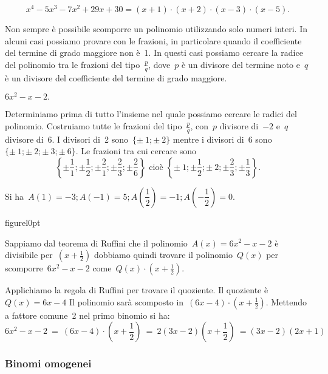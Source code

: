 \begin{exrig}
\[x^{4}-5x^{3}-7x^{2}+29x+30=(x+1)\cdot (x+2)\cdot (x-3)\cdot (x-5).\]

Non sempre è possibile scomporre un polinomio utilizzando solo numeri
interi. In alcuni casi possiamo provare con le frazioni, in particolare
quando il coefficiente del termine di grado maggiore non è~1. In
questi casi possiamo cercare la radice del polinomio tra le frazioni
del tipo~$\frac{p}{q}$, dove~$p$ è un divisore del termine noto e~$q$ è
un divisore del coefficiente del termine di grado maggiore.


\begin{esempio}
$6x^{2}-x-2.$
\end{esempio}

Determiniamo prima di tutto l'insieme nel quale
possiamo cercare le radici del polinomio. Costruiamo tutte le frazioni
del tipo~$\frac{p}{q}$, con~$p$ divisore di~$-2$ e~$q$ divisore di~$6$. I
divisori di~2 sono~$\{\pm~1;\pm~2\}$ 
mentre i divisori di~6 sono~$\{\pm~1;\pm~2;\pm~3;\pm~6\}$.
Le frazioni tra cui cercare sono
\[\left\{\pm {\frac{1}{1}};\pm \frac{1}{2};\pm \frac{2}{1};\pm
\frac{2}{3};\pm \frac{2}{6}\right\}
\text{ cioè }
\left\{\pm~1;\pm\frac{1}{2};\pm~2;\pm \frac{2}{3};\pm \frac{1}{3}\right\}.\]

Si ha~$A(1)=-3; A(-1)=5; A\left(\dfrac{1}{2}\right)=
       -1; A\left(-{\dfrac{1}{2}}\right)=0$.

\begin{wrapfloat}{figure}{l}{0pt}
 
\end{wrapfloat}
Sappiamo dal teorema di Ruffini che il polinomio~$A(x)=6x^{2}-x-2$ è
divisibile per~$\left(x+\frac{1}{2}\right)$ dobbiamo quindi trovare il
polinomio~$Q(x)$ per scomporre~$6x^{2}-x-2$ 
come~$Q(x)\cdot \left(x+\frac{1}{2}\right)$.

Applichiamo la regola di Ruffini per trovare il quoziente. 
Il quoziente è~$Q(x)=6x-4$
Il polinomio sarà scomposto in~$(6x-4)\cdot\left(x+\frac{1}{2}\right)$.
Mettendo a fattore comune~2 nel primo binomio si ha:
\[6x^{2}-x-2\ =
\ (6x-4)\cdot \left(x+\frac{1}{2}\right)\ =
\ 2(3x-2)\left(x+\frac{1}{2}\right)\ =(3x-2)(2x+1)\]


\end{exrig}



\subsubsection{Binomi omogenei}
\label{subsubsec:divpol_binomo}

